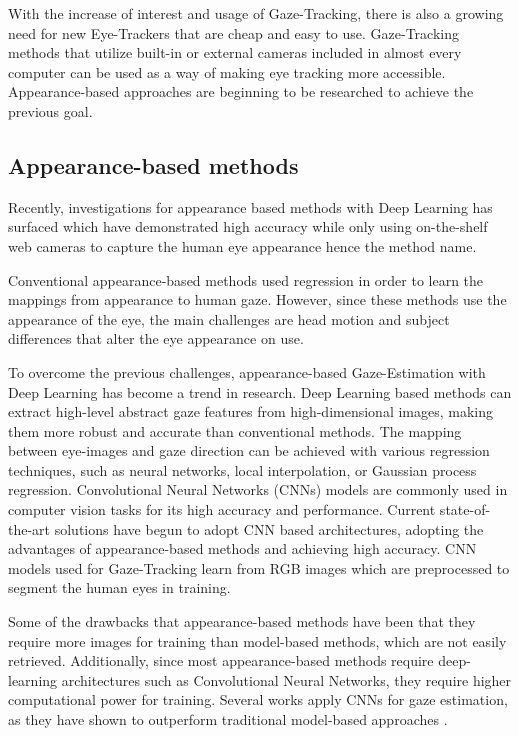 \documentclass[letterpaper, 10 pt, conference]{ieeeconf}
\begin{document}
With the increase of interest and usage of Gaze-Tracking, there is also a growing need for new Eye-Trackers that are cheap and easy to use.
Gaze-Tracking methods that utilize built-in or external cameras included in almost every computer can be used as a way of making eye tracking more accessible. Appearance-based approaches are beginning to be researched to achieve the previous goal.

\subsection{Appearance-based methods}
Recently, investigations for appearance based methods with Deep Learning has surfaced which have demonstrated high accuracy while only using on-the-shelf web cameras to capture the human eye appearance hence the method name.

Conventional appearance-based methods used regression in order to learn the mappings from appearance to human gaze. However, since these methods use the appearance of the eye, the main challenges are head motion and subject differences that alter the eye appearance on use.

To overcome the previous challenges, appearance-based Gaze-Estimation with Deep Learning has become a trend in research. Deep Learning based methods can extract high-level abstract gaze features from high-dimensional images, making them more robust and accurate than conventional methods. The mapping between eye-images and gaze direction can be achieved with various regression techniques, such as neural networks, local interpolation, or Gaussian process regression. Convolutional Neural Networks (CNNs) models are commonly used in computer vision tasks for its high accuracy and performance. 
Current state-of-the-art solutions have begun to adopt CNN based architectures, adopting the advantages of appearance-based methods and achieving high accuracy. CNN models used for Gaze-Tracking learn from RGB images which are preprocessed to segment the human eyes in training.

Some of the drawbacks that appearance-based methods have been that they require more images for training than model-based methods, which are not easily retrieved. Additionally, since most appearance-based methods require deep-learning architectures such as Convolutional Neural Networks, they require higher computational power for training. Several works apply CNNs for gaze estimation, as they have shown to outperform traditional model-based approaches \cite{GazeEstimationInTheWild}.
\end{document}
